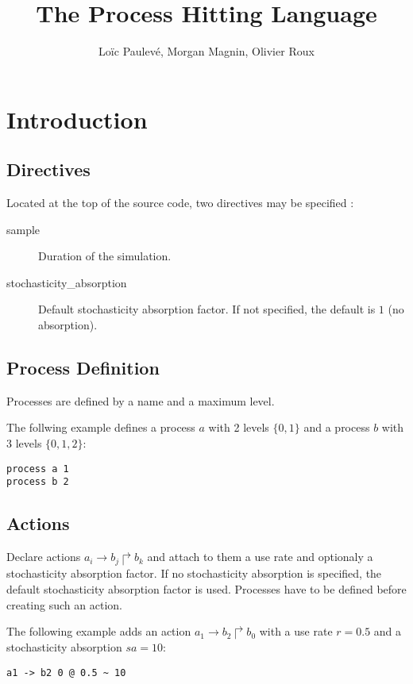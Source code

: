 \documentclass[11pt]{article}
\title{The Process Hitting Language}
\author{Lo\"ic Paulev\'e, Morgan Magnin, Olivier Roux}
\newcommand{\hit}[3]{\mbox{$#1\rightarrow#2\Rsh#3$}}
\begin{document}
\maketitle

\section{Introduction}

\subsection{Directives}

Located at the top of the source code, two directives may be specified :
\begin{description}
\item[sample] Duration of the simulation.
\item[stochasticity\_absorption] Default stochasticity absorption factor. If not specified, the default is $1$ (no absorption).
\end{description}

\subsection{Process Definition}

Processes are defined by a name and a maximum level.

\noindent The follwing example defines a process $a$ with 2 levels $\{0,1\}$ and a process $b$ with 3 levels $\{0,1,2\}$:
\begin{verbatim}
process a 1
process b 2
\end{verbatim}


\subsection{Actions}

Declare actions $\hit{a_i}{b_j}{b_k}$ and attach to them a use rate and optionaly a stochasticity absorption factor.
If no stochasticity absorption is specified, the default stochasticity absorption factor is used.
Processes have to be defined before creating such an action.

\noindent The following example adds an action $\hit{a_1}{b_2}{b_0}$ with a use rate $r=0.5$ and a stochasticity absorption $sa = 10$:
\begin{verbatim}
a1 -> b2 0 @ 0.5 ~ 10
\end{verbatim}
\end{document}

